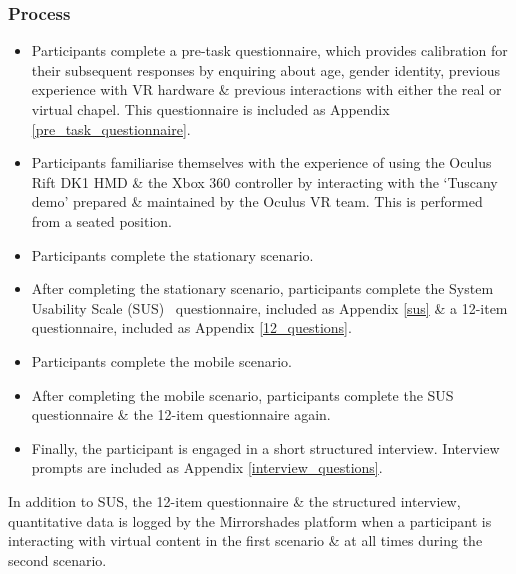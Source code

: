 \subsubsection{Process}
\begin{itemize}
	\item Participants complete a pre-task questionnaire, which provides calibration for their subsequent responses by enquiring about age, gender identity, previous experience with VR hardware \& previous interactions with either the real or virtual chapel. This questionnaire is included as Appendix \ref{pre_task_questionnaire}.
	
	\item Participants familiarise themselves with the experience of using the Oculus Rift DK1 HMD \& the Xbox 360 controller by interacting with the `Tuscany demo' prepared \& maintained by the Oculus VR team. This is performed from a seated position.
	
	\item Participants complete the stationary scenario.
	
	\item After completing the stationary scenario, participants complete the System Usability Scale (SUS)~\cite{Brooke1996} questionnaire, included as Appendix \ref{sus} \& a 12-item questionnaire, included as Appendix \ref{12_questions}.
	
	\item Participants complete the mobile scenario.
	
	\item After completing the mobile scenario, participants complete the SUS questionnaire \& the 12-item questionnaire again.
	
	\item Finally, the participant is engaged in a short structured interview. Interview prompts are included as Appendix \ref{interview_questions}.
\end{itemize}

In addition to SUS, the 12-item questionnaire \& the structured interview, quantitative data is logged by the Mirrorshades platform when a participant is interacting with virtual content in the first scenario \& at all times during the second scenario.

